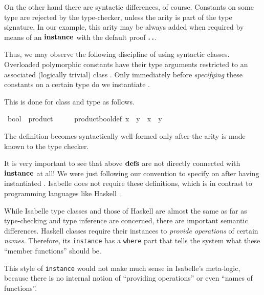 \begin{isabellebody}
\begin{isamarkuptext}
  On the other hand there are syntactic differences, of course.
  Constants \isa{{\isasymodot}} on some type \isa{{\isasymtau}} are rejected by the
  type-checker, unless the arity  is part of the
  type signature.  In our example, this arity may be always added when
  required by means of an ${\mathord{\mathbf{instance}}}$ with the default proof $\textbf{.\,.}$.

  \medskip Thus, we may observe the following discipline of using
  syntactic classes.  Overloaded polymorphic constants have their type
  arguments restricted to an associated (logically trivial) class
  .  Only immediately before \emph{specifying} these
  constants on a certain type \isa{{\isasymtau}} do we instantiate .

  This is done for class  and type  as
  follows.%
\end{isamarkuptext}%
\isamarkupfalse%
\ bool\ {\isacharcolon}{\isacharcolon}\ product%
\isadelimproof
\ %
\endisadelimproof
%
\isatagproof
\isamarkupfalse%
\isacommand{{\isachardot}{\isachardot}}%
\endisatagproof
{\isafoldproof}%
%
\isadelimproof
%
\endisadelimproof
\isanewline
\isamarkupfalse%
\ {\isacharparenleft}\isanewline
\ \ product{\isacharunderscore}bool{\isacharunderscore}def{\isacharcolon}\ {\isachardoublequote}x\ {\isasymodot}\ y\ {\isasymequiv}\ x\ {\isasymand}\ y{\isachardoublequote}\isamarkuptrue%
%
\begin{isamarkuptext}%
The definition  becomes syntactically
 well-formed only after the arity  is made
 known to the type checker.

 \medskip It is very important to see that above ${\mathord{\mathbf{defs}}}$ are not
 directly connected with ${\mathord{\mathbf{instance}}}$ at all!  We were just following
 our convention to specify \isa{{\isasymodot}} on  after having
 instantiated .  Isabelle does not require
 these definitions, which is in contrast to programming languages like
 Haskell \cite{haskell-report}.

 \medskip While Isabelle type classes and those of Haskell are almost
 the same as far as type-checking and type inference are concerned,
 there are important semantic differences.  Haskell classes require
 their instances to \emph{provide operations} of certain \emph{names}.
 Therefore, its \texttt{instance} has a \texttt{where} part that tells
 the system what these ``member functions'' should be.

 This style of \texttt{instance} would not make much sense in
 Isabelle's meta-logic, because there is no internal notion of
 ``providing operations'' or even ``names of functions''.%
\end{isamarkuptext}%
%
\isadelimtheory
%
\endisadelimtheory
%
\isatagtheory
\isamarkupfalse%
%
\endisatagtheory
{\isafoldtheory}%
%
\isadelimtheory
%
\endisadelimtheory
\isanewline
\end{isabellebody}%
